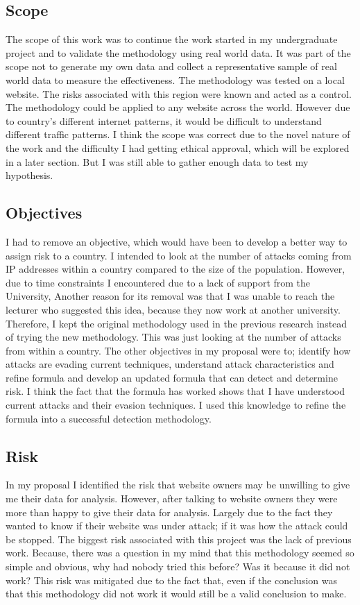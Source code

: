 \subsection{Scope}

The scope of this work was to continue the work started in my undergraduate project and to validate the methodology using real world data. It was part of the scope not to generate my own data and collect a representative sample of real world data to measure the effectiveness. The methodology was tested on a local website. The risks associated with this region were known and acted as a control. The methodology could be applied to any website across the world. However due to country's different internet patterns, it would be difficult to understand different traffic patterns. I think the scope was correct due to the novel nature of the work and the difficulty I had getting ethical approval, which will be explored in a later section. But I was still able to gather enough data to test my hypothesis.



\subsection{Objectives}

I had to remove an objective, which would have been to develop a better way to assign risk to a country. I intended to look at the number of attacks coming from IP addresses within a country compared to the size of the population. However, due to time constraints I encountered due to a lack of support from the University, Another reason for its removal was that I was unable to reach the lecturer who suggested this idea, because they now work at another university. Therefore, I kept the original methodology used in the previous research instead of trying the new methodology. This was just looking at the number of attacks from within a country. The other objectives in my proposal were to; identify how attacks are evading current techniques, understand attack characteristics and refine formula and develop an updated formula that can detect and determine risk. I think the fact that the formula has worked shows that I have understood current attacks and their evasion techniques. I used this knowledge to refine the formula into a successful detection methodology.

\subsection{Risk}

In my proposal I identified the risk that website owners may be unwilling to give me their data for analysis. However, after talking to website owners they were more than happy to give their data for analysis. Largely due to the fact they wanted to know if their website was under attack; if it was how the attack could be stopped. The biggest risk associated with this project was the lack of previous work. Because, there was a question in my mind that this methodology seemed so simple and obvious, why had nobody tried this before? Was it because it did not work? This risk was mitigated due to the fact that, even if the conclusion was that this methodology did not work it would still be a valid conclusion to make.